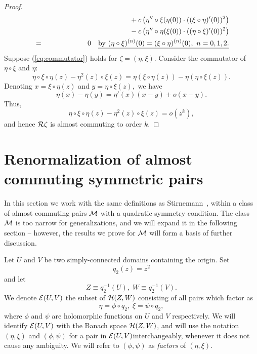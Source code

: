 \begin{proof}
{\begin{eqnarray}
 \nonumber  &\phantom{=}& \phantom{c \left( \eta' \circ \xi(\eta(0)) \cdot (\xi \circ \eta)''(0) \right)} + c \left( \eta'' \circ \xi(\eta(0)) \cdot ((\xi \circ \eta)'(0))^2 \right) \\
\nonumber  &\phantom{=}& \phantom{c \left( \eta' \circ \xi(\eta(0)) \cdot (\xi \circ \eta)''(0) \right)} - c \left( \eta'' \circ \eta(\xi(0)) \cdot ((\eta \circ \xi)'(0))^2 \right) \\
\label{eq:rcommute2}  &=&0  \quad \underline{{\rm by} \ (\eta \circ \xi)^{(n)}(0)=(\xi \circ \eta)^{(n)}(0), \ n=0,1,2.}
\end{eqnarray}
}
Suppose  (\ref{eq:commutator}) holds for $\zeta=(\eta,\xi)$. Consider the commutator of $\eta\circ \xi$ and $\eta$:
$$\eta\circ\xi\circ\eta(z)-\eta^2(z)\circ\xi(z)=\eta(\xi\circ\eta(z))-\eta(\eta\circ\xi(z)).$$
Denoting $x=\xi\circ\eta(z)$ and $y=\eta\circ\xi(z),$ we have
$$\eta(x)-\eta(y)=\eta'(x)(x-y)+o(x-y).$$
Thus, 
$$\eta\circ\xi\circ\eta(z)-\eta^2(z)\circ\xi(z)=o(z^k),$$
and hence $\mathcal{R}\zeta$ is almost commuting to order $k$.
\end{proof}


\section{Renormalization of almost commuting symmetric pairs}\label{sec:ACSM}
In this section we work with the same definitions as Stirnemann~\cite{Stir}, within a class of almost commuting pairs $\mathcal{M}$ with a quadratic symmetry condition. The class $\mathcal{M}$ is too narrow for generalizations, and we will expand it in the following section -- however, the results we prove for $\mathcal{M}$ will form a basis of  further discussion. 





Let $U$ and $V$ be two simply-connected domains containing the origin. Set $$q_2(z)=z^2$$ and let 
$$Z\equiv q^{-1}_2(U),\;W\equiv q^{-1}_2(V).$$
We denote $\mathcal{E}(U,V)$ the subset of $\mathcal{H}(Z,W)$ consisting of all pairs which factor as 
\begin{equation}\label{eq:factors}
\eta=\phi\circ q_2,\;\xi=\psi\circ q_2,
\end{equation}
where $\phi$ and $\psi$ are holomorphic functions on $U$ and $V$ respectively. We will identify $\mathcal{E}(U,V)$ with the Banach space $\mathcal{H}(Z,W)$, and will use the notation $(\eta,\xi)$ and $(\phi,\psi)$ for a pair in $\mathcal{E}(U,V)$interchangeably, whenever it does not cause any ambiguity.  We will refer to $(\phi,\psi)$ as {\it factors} of $(\eta,\xi)$.

